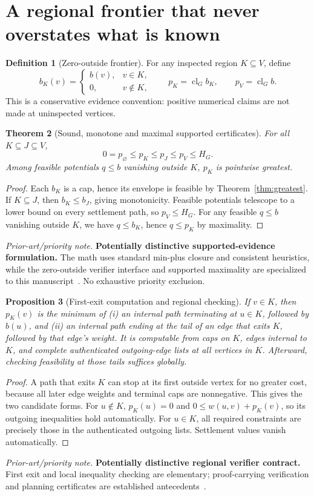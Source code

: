\documentclass[11pt,letterpaper]{article}
\newtheorem{theorem}{Theorem}[section]
\newtheorem{proposition}[theorem]{Proposition}
\theoremstyle{definition}
\newtheorem{definition}[theorem]{Definition}
\theoremstyle{remark}
\newcommand{\Cl}{\operatorname{cl}}
\newcommand{\novel}[1]{\par\begingroup\small\textit{Prior-art/priority note.} #1\par\endgroup}
\begin{document}
\section{A regional frontier that never overstates what is known}
\begin{definition}[Zero-outside frontier]\label{def:frontier}
For any inspected region \(K\subseteq V\), define
\[
b_K(v)=\begin{cases}b(v),&v\in K,\\0,&v\notin K,\end{cases}\qquad p_K=\Cl_G b_K,\qquad p_V=\Cl_G b.
\]
This is a conservative evidence convention: positive numerical claims are not made at uninspected vertices.
\end{definition}
\begin{theorem}[Sound, monotone and maximal supported certificates]\label{thm:frontiers}
For all \(K\subseteq J\subseteq V\),
\[
0=p_{\varnothing}\le p_K\le p_J\le p_V\le H_G.
\]
Among feasible potentials \(q\le b\) vanishing outside \(K\), \(p_K\) is pointwise greatest.
\end{theorem}
\begin{proof}
Each \(b_K\) is a cap, hence its envelope is feasible by Theorem~\ref{thm:greatest}. If \(K\subseteq J\), then \(b_K\le b_J\), giving monotonicity. Feasible potentials telescope to a lower bound on every settlement path, so \(p_V\le H_G\). For any feasible \(q\le b\) vanishing outside \(K\), we have \(q\le b_K\), hence \(q\le p_K\) by maximality.
\end{proof}
\novel{\textbf{Potentially distinctive supported-evidence formulation.} The math uses standard min-plus closure and consistent heuristics, while the zero-outside verifier interface and supported maximality are specialized to this manuscript~\cite{Hart1968,Mohri,Lauer2025,W2}. No exhaustive priority exclusion.}

\begin{proposition}[First-exit computation and regional checking]\label{prop:regional}
If \(v\in K\), then \(p_K(v)\) is the minimum of (i) an internal path terminating at \(u\in K\), followed by \(b(u)\), and (ii) an internal path ending at the tail of an edge that exits \(K\), followed by that edge's weight. It is computable from caps on \(K\), edges internal to \(K\), and complete authenticated outgoing-edge lists at all vertices in \(K\). Afterward, checking feasibility at those tails suffices globally.
\end{proposition}
\begin{proof}
A path that exits \(K\) can stop at its first outside vertex for no greater cost, because all later edge weights and terminal caps are nonnegative. This gives the two candidate forms. For \(u\notin K\), \(p_K(u)=0\) and \(0\le w(u,v)+p_K(v)\), so its outgoing inequalities hold automatically. For \(u\in K\), all required constraints are precisely those in the authenticated outgoing lists. Settlement values vanish automatically.
\end{proof}
\novel{\textbf{Potentially distinctive regional verifier contract.} First exit and local inequality checking are elementary; proof-carrying verification and planning certificates are established antecedents~\cite{Dijkstra,Necula,Mugdan2023,Dold2025}.}
\end{document}
